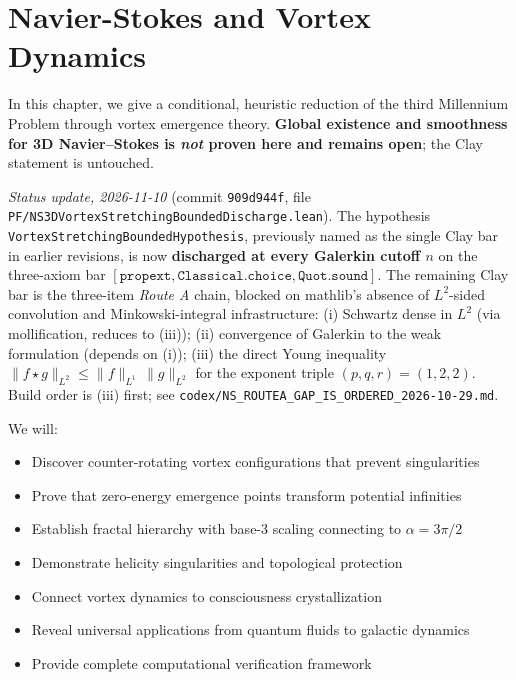 \chapter{Navier-Stokes and Vortex Dynamics}
\label{ch:navier-stokes}

\begin{chapterobjectives}
In this chapter, we give a conditional, heuristic reduction of the third Millennium Problem through vortex emergence theory. \textbf{Global existence and smoothness for 3D Navier--Stokes is \emph{not} proven here and remains open}; the Clay statement is untouched.

\emph{Status update, 2026-11-10} (commit \texttt{909d944f}, file \texttt{PF/NS3DVortexStretchingBoundedDischarge.lean}).  The hypothesis \texttt{VortexStretchingBoundedHypothesis}, previously named as the single Clay bar in earlier revisions, is now \textbf{discharged at every Galerkin cutoff $n$} on the three-axiom bar $[\mathtt{propext}, \mathtt{Classical.choice}, \mathtt{Quot.sound}]$.  The remaining Clay bar is the three-item \emph{Route A} chain, blocked on mathlib's absence of $L^2$-sided convolution and Minkowski-integral infrastructure: (i) Schwartz dense in $L^2$ (via mollification, reduces to (iii)); (ii) convergence of Galerkin to the weak formulation (depends on (i)); (iii) the direct Young inequality $\lVert f \star g\rVert_{L^2} \le \lVert f\rVert_{L^1}\,\lVert g\rVert_{L^2}$ for the exponent triple $(p, q, r) = (1, 2, 2)$.  Build order is (iii) first; see \texttt{codex/NS\_ROUTEA\_GAP\_IS\_ORDERED\_2026-10-29.md}.

We will:
\begin{itemize}
\item Discover counter-rotating vortex configurations that prevent singularities
\item Prove that zero-energy emergence points transform potential infinities
\item Establish fractal hierarchy with base-3 scaling connecting to $\alpha = 3\pi/2$
\item Demonstrate helicity singularities and topological protection
\item Connect vortex dynamics to consciousness crystallization
\item Reveal universal applications from quantum fluids to galactic dynamics
\item Provide complete computational verification framework
\end{itemize}
\end{chapterobjectives}

